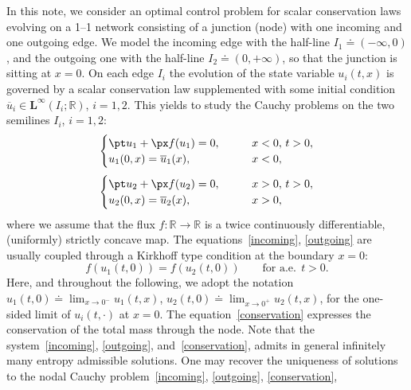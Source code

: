 \documentclass[a4paper, 10pt, final]{article}
\newcommand{\R}{\mathbb{R}} \newcommand{\N}{\mathbb{N}}
\begin{document}
In this note, we consider an optimal control problem for scalar conservation laws evolving on a 1–1 network consisting of a junction (node) with one incoming and one outgoing edge.
We model the 
incoming edge  with the half-line $I_1\doteq (-\infty, 0)$, and
the outgoing one with the half-line $I_2\doteq (0, +\infty)$,
so that the junction is   sitting at  $x=0$.
On each edge $I_i$ the evolution of the state variable $u_i(t,x)$ is governed by a
scalar conservation law 
supplemented with some initial condition $\overline u_i\in  \mathbf{L^\infty}(I_i; \R)$,
$i=1,2$.
This yields to study the Cauchy problems
on the two semilines $I_i$, $i=1,2$:
%
\begin{equation}
  \label{incoming} 
  \begin{cases} \pt u_1 +\px f(u_1)=0, \qquad & x<0, \, t>0,\\ 
    u_1(0,x)= \overline u_1(x), & x<0,\end{cases}
\end{equation} 
%
%
\begin{equation}\label{outgoing}
  \begin{cases} \pt u_2 +\px f(u_2)=0,  \qquad & x>0, \, t>0,\\ 
    u_2(0,x)= \overline u_2(x), & x>0,\end{cases}
\end{equation} 
%
where we assume that the flux  $f:\R\to\R$
is a twice continuously differentiable, (uniformly) strictly concave map.
The equations~\eqref{incoming}, \eqref{outgoing} are usually coupled through a Kirkhoff type condition at the boundary $x=0$:
\begin{equation}\label{conservation}
f(u_1(t,0))= f(u_2(t,0))
\qquad\textrm{for a.e.} \ \ t>0.
\end{equation}
Here, and throughout the following, we adopt the notation
$u_1(t,0)\doteq \lim_{x\to 0^-} u_1(t,x)$,
$u_2(t,0)\doteq \lim_{x\to 0^+} u_2(t,x)$,
for the one-sided limit 
of $u_i(t,\cdot)$ at $x=0$.
The equation~\eqref{conservation} expresses the conservation of the total mass through the node.
Note that the system~\eqref{incoming}, \eqref{outgoing}, and~\eqref{conservation}, 
admits in general infinitely many entropy admissible solutions.
One may recover the uniqueness of solutions to the
nodal Cauchy problem~\eqref{incoming}, \eqref{outgoing}, \eqref{conservation},
\end{document}
